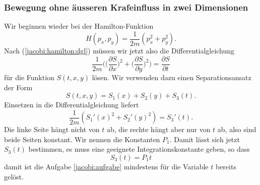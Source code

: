 \subsubsection{Bewegung ohne äusseren Krafeinfluss in zwei Dimensionen}
Wir beginnen wieder bei der Hamilton-Funktion 
\[
H(p_x, p_y)=\frac1{2m}(p_x^2+p_y^2).
\]
Nach (\ref{jacobi:hamilton:dgl}) müssen wir jetzt also die
Differentialgleichung
\[
\frac1{2m}\biggl(
\biggl(\frac{\partial S}{\partial x}\biggr)^2
+
\biggl(\frac{\partial S}{\partial y}\biggr)^2
\biggr)=\frac{\partial S}{\partial t}
\]
für die Funktion $S(t,x,y)$ lösen. Wir verwenden dazu einen 
Separationsansatz der Form
\[
S(t,x,y)=S_1(x)+S_2(y) + S_3(t).
\]
Einsetzen in die Differentialgleichung liefert
\begin{equation}
\frac1{2m}( S_1'(x)^2+S_2'(y)^2)=S_3'(t).
\label{jacobi:kraeftefrei:sep1}
\end{equation}
Die linke Seite hängt nicht von $t$ ab, die rechte hängt
aber nur von $t$ ab, also sind beide Seiten konstant.
Wir nennen die Konstanten $P_1$. Damit lässt sich
jetzt $S_3(t)$ bestimmen, es muss eine geeignete Integrationskonstante
geben, so dass
\[
S_3(t)=P_1t
\]
damit ist die Aufgabe \ref{jacobi:aufgabe} mindestens für die Variable
$t$ bereits gelöst.

